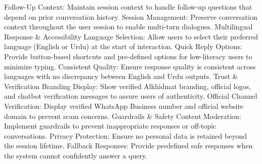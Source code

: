 \begin{outline}
  \3 Follow-Up Context: Maintain session context to handle follow-up questions that depend on prior conversation history. 
  \3 Session Management: Preserve conversation context throughout the user session to enable multi-turn dialogues.
  \2 Multilingual Response \& Accessibility 
  \3 Language Selection: Allow users to select their preferred language (English or Urdu) at the start of interaction. 
  \3 Quick Reply Options: Provide button-based shortcuts and pre-defined options for low-literacy users to minimize typing. 
  \3 Consistent Quality: Ensure response quality is consistent across languages with no discrepancy between English and Urdu outputs. 
  \2 Trust \& Verification
  \3 Branding Display: Show verified Alkhidmat branding, official logos, and chatbot verification messages to assure users of authenticity. 
  \3 Official Channel Verification: Display verified WhatsApp Business number and official website domain to prevent scam concerns. 
  \2 Guardrails \& Safety 
  \3 Content Moderation: Implement guardrails to prevent inappropriate responses or off-topic conversations. 
  \3 Privacy Protection: Ensure no personal data is retained beyond the session lifetime. 
  \3 Fallback Responses: Provide predefined safe responses when the system cannot confidently answer a query. 
  

\end{outline}
